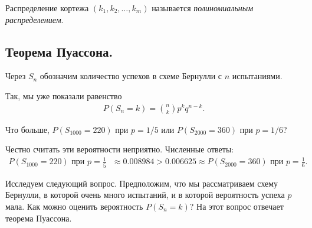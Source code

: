 \documentclass[../main.tex]{subfiles}
\begin{document}
Распределение кортежа $ (k_1, k_2, \ldots, k_m) $ называется \textit{полиномиальным распределением}.

\subsection{Теорема Пуассона.}

\begin{notatn*}
 Через $S_n$ обозначим количество успехов в схеме Бернулли с $n$ испытаниями.
\end{notatn*}

Так, мы уже показали равенство
\begin{align*}
 P(S_n = k) = \binom n k p^{k} q^{n-k}.
\end{align*} 

\begin{exmpl*}
 Что больше, $P(S_{1000} = 220)$ при $p = 1 / 5$ или $P(S_{2000} = 360)$ при $p = 1 / 6$?

 Честно считать эти вероятности неприятно. Численные ответы:
 \begin{align*}
  P(S_{1000} = 220) \text{ при $p = \frac{1}{5}$ } \approx 0.008984 > 0.006625 \approx P(S_{2000} = 360) \text{ при $p = \frac{1}{6}$}
 .\end{align*}
\end{exmpl*}

Исследуем следующий вопрос. Предположим, что мы рассматриваем схему Бернулли, в которой очень много испытаний, и в которой вероятность успеха $ p $ мала. Как можно оценить вероятность $ P(S_n = k) $? На этот вопрос отвечает теорема Пуассона.
\end{document}
